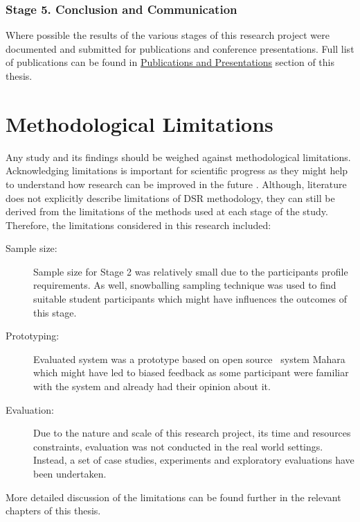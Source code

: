 \subsubsection{Stage 5. Conclusion and Communication}

Where possible the results of the various stages of this research project were
documented and submitted for publications and conference presentations. Full
list of publications can be found in \hyperref[sec:pub]{Publications and
Presentations} section of this thesis.

\section{Methodological Limitations}
\label{sec:limits}

%

Any study and its findings should be weighed against methodological
limitations. Acknowledging limitations is important for scientific progress as
they might help to understand how research can be improved in the future
\citep{Ioannidis2007}. Although, literature does not explicitly describe
limitations of DSR methodology, they can still be derived from the limitations
of the methods used at each stage of the study. Therefore, the limitations
considered in this research included:

\begin{description}
\item[Sample size:] Sample size for Stage 2 was relatively small due to the
participants profile requirements. As well, snowballing sampling technique was
used to find suitable student participants which might have influences the
outcomes of this stage.
\item[Prototyping:] Evaluated system was a prototype based on open source
\ep~system Mahara which might have led to biased feedback as some participant
were familiar with the system and already had their opinion about it.
\item[Evaluation:] Due to the nature and scale of this research project, its
time and resources constraints, evaluation was not conducted in the real world
settings. Instead, a set of case studies, experiments and exploratory
evaluations have been undertaken.
\end{description}

More detailed discussion of the limitations can be found further in the relevant
chapters of this thesis.

